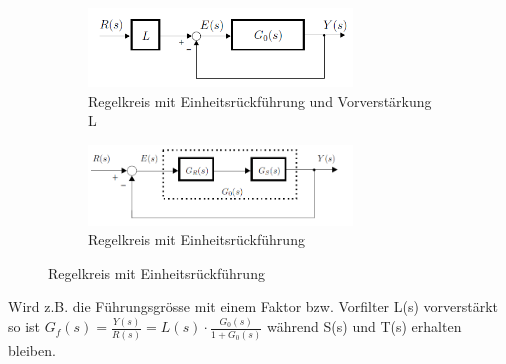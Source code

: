 \begin{figure}[h]
	\begin{center}
	\begin{subfigure}[b]{8cm}
		\centering
		\includegraphics[width=7cm]{./images/regelkreismitL.png}
		\caption{Regelkreis mit Einheitsrückführung und Vorverstärkung L}
	\end{subfigure}\qquad
	\begin{subfigure}[b]{8cm}
		\centering
		\includegraphics[width=7cm]{./images/RegelkreisEinheitsrueckfuehrung.png}
		\caption{Regelkreis mit Einheitsrückführung}
	\end{subfigure}
	\end{center}
\end{figure}
	Wird z.B. die Führungsgrösse mit einem Faktor bzw. Vorfilter L(s) vorverstärkt so ist $G_f(s)=\frac{Y(s)}{R(s)}=L(s)\cdot\frac{G_0(s)}{1+G_0(s)}$ während S(s) und T(s) erhalten bleiben.
%


